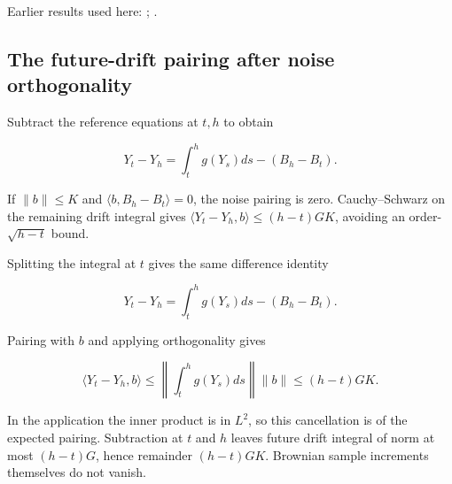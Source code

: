 \documentclass[11pt,a4paper]{report}
\begin{document}
Earlier results used here: \cite[Section~3.11.1]{LangevinLean2026ULASC}; \cite[Section~3.11.6]{LangevinLean2026ULASC}.
\subsection{\texorpdfstring{The future-drift pairing after noise orthogonality}{The future-drift pairing after noise orthogonality}}
\label{report-step-ProximalLangevin-SplittingProcess-lean-2}


Subtract the reference equations at \(t,h\) to obtain

\[Y_t-Y_h=\int_t^h g(Y_s)ds-(B_h-B_t).\]

If \(\|b\|\le K\) and \(\langle b,B_h-B_t\rangle=0\), the noise pairing is zero. Cauchy–Schwarz on the remaining drift integral gives \(\langle Y_t-Y_h,b\rangle\le(h-t)GK\), avoiding an order-\(\sqrt{h-t}\) bound.



Splitting the integral at \(t\) gives the same difference identity

\[Y_t-Y_h=\int_t^h g(Y_s)ds-(B_h-B_t).\]

Pairing with \(b\) and applying orthogonality gives

\[\langle Y_t-Y_h,b\rangle\le\left\|\int_t^h g(Y_s)ds\right\|\|b\|\le(h-t)GK.\]

In the application the inner product is in \(L^2\), so this cancellation is of the expected pairing. Subtraction at \(t\) and \(h\) leaves future drift integral of norm at most \((h-t)G\), hence remainder \((h-t)GK\). Brownian sample increments themselves do not vanish.
\end{document}
